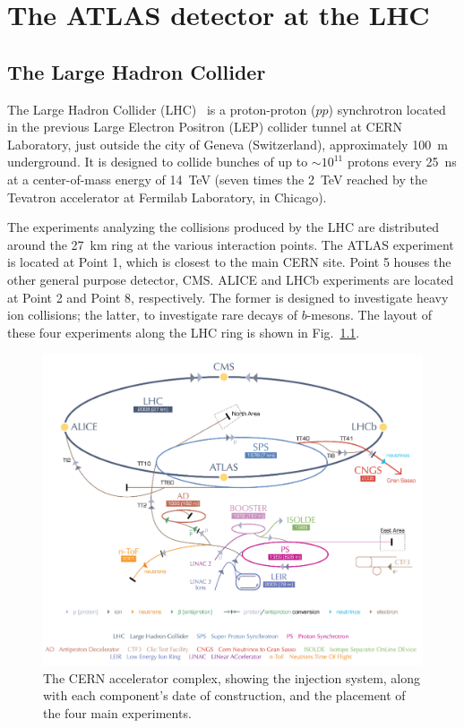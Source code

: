 %
%
\chapter{The ATLAS detector at the LHC}\label{ch:lhc_atlas}

\section{The Large Hadron Collider}


The Large Hadron Collider  (LHC)~\cite{Breskin:1244506} is a proton-proton ($pp$) synchrotron located in the previous Large Electron Positron (LEP) collider tunnel at CERN Laboratory, just outside the city of Geneva (Switzerland), approximately 100~m underground. It is designed to collide bunches of up to $\sim 10^{11}$ protons every 25~ns at a center-of-mass energy of 14~TeV (seven times the 2~TeV reached by the Tevatron accelerator at Fermilab Laboratory, in Chicago). 

The experiments analyzing the collisions produced by the LHC are distributed around the 27~km ring at the various interaction points. The ATLAS experiment is located at Point 1, which is closest to the main CERN site. Point 5 houses the other general purpose detector, CMS. ALICE and LHCb experiments are located at Point 2 and Point 8, respectively. The former is designed to investigate heavy ion collisions; the latter, to investigate rare decays of $b$-mesons. The layout of these four experiments along the LHC ring is shown in Fig.~\ref{fig:LHC1}.

\begin{figure}[htbp]
  \begin{center}
      \includegraphics[width=1\textwidth]{Fig2/CERNacceleratorcomplexCut.pdf}
    \caption{The CERN accelerator complex, showing the injection system, along with each component's date of construction, and the placement of the four main experiments.}
    \label{fig:LHC1}
  \end{center}
\end{figure}


